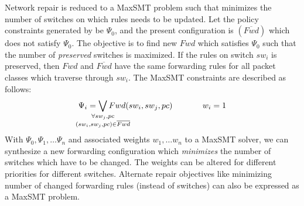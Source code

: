 Network repair is reduced to a MaxSMT problem
such that \name minimizes
the number of switches on which rules needs to be updated. Let
the policy constraints generated by \name be $\Psi_0$, and the present 
configuration is $(\overline{Fwd})$ which does not satisfy $\Psi_0$. The 
objective is to find new $Fwd$ which satisfies $\Psi_0$ such that the number of \emph{preserved} switches 
is maximized. If the rules on switch $sw_i$ is preserved, then $Fwd$ and $\overline{Fwd}$ have the same forwarding rules for all packet classes which
traverse through $sw_i$. The MaxSMT constraints are described as follows:
\begin{equation}
	\Psi_i =  
	  \bigvee_{\mathclap{\substack{\forall sw_j, pc \\
			  		(sw_i, sw_j, pc) \in \overline{Fwd}}}} Fwd(sw_i, sw_j, pc) 
			~~~~~~~~~~~ 
			w_i = 1
\end{equation}
With $\Psi_0, \Psi_1, \ldots \Psi_n$ and associated weights $w_1, \ldots w_n$
to a MaxSMT solver, we can synthesize a new forwarding configuration 
which \emph{minimizes} the number of switches which have to be changed.
The weights can be altered for different priorities for different switches. Alternate
repair objectives like minimizing number of changed forwarding rules (instead of 
switches) can also be expressed as a MaxSMT problem. 



 







 